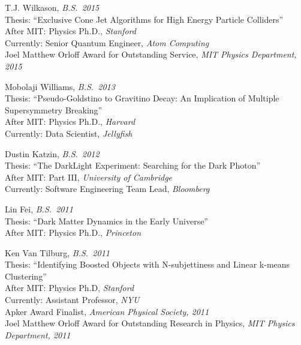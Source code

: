 \item T.J. Wilkason, \emph{B.S.~2015}
\\ Thesis: ``Exclusive Cone Jet Algorithms for High Energy Particle Colliders''
\\ After MIT: Physics Ph.D., \emph{Stanford}
\\ Currently: Senior Quantum Engineer, \emph{Atom Computing}
\\ Joel Matthew Orloff Award for Outstanding Service, \emph{MIT Physics Department, 2015}

\item Mobolaji Williams, \emph{B.S.~2013}
\\ Thesis: ``Pseudo-Goldstino to Gravitino Decay: An Implication of Multiple Supersymmetry Breaking''
\\ After MIT: Physics Ph.D., \emph{Harvard}
\\ Currently: Data Scientist, \emph{Jellyfish}

\item Dustin Katzin, \emph{B.S.~2012}
\\ Thesis: ``The DarkLight Experiment: Searching for the Dark Photon''
\\ After MIT: Part III, \emph{University of Cambridge}
\\ Currently: Software Engineering Team Lead, \emph{Bloomberg}

\item Lin Fei, \emph{B.S.~2011}
\\ Thesis: ``Dark Matter Dynamics in the Early Universe''
\\ After MIT: Physics Ph.D., \emph{Princeton}

\item Ken Van Tilburg, \emph{B.S.~2011}
\\ Thesis: ``Identifying Boosted Objects with N-subjettiness and Linear k-means Clustering''
\\ After MIT: Physics Ph.D, \emph{Stanford}
\\ Currently: Assistant Professor, \emph{NYU}
\\ Apker Award Finalist, \emph{American Physical Society, 2011}
\\ Joel Matthew Orloff Award for Outstanding Research in Physics, \emph{MIT Physics Department, 2011}

\el
